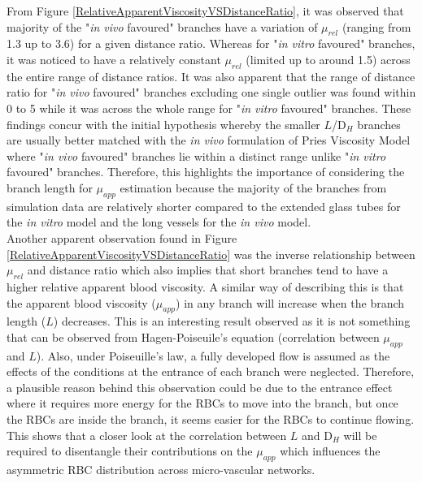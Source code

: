 \noindent From Figure \ref{RelativeApparentViscosityVSDistanceRatio}, it was observed that majority of the "\textit{in vivo} favoured" branches have a variation of $\mu_{rel}$ (ranging from 1.3 up to 3.6) for a given distance ratio. Whereas for "\textit{in vitro} favoured" branches, it was noticed to have a relatively constant $\mu_{rel}$ (limited up to around 1.5) across the entire range of distance ratios. It was also apparent that the range of distance ratio for "\textit{in vivo} favoured" branches excluding one single outlier was found within 0 to 5 while it was across the whole range for "\textit{in vitro} favoured" branches. These findings concur with the initial hypothesis whereby the smaller $L$/D$_{H}$ branches are usually better matched with the \textit{in vivo} formulation of Pries Viscosity Model where "\textit{in vivo} favoured" branches lie within a distinct range unlike "\textit{in vitro} favoured" branches. Therefore, this highlights the importance of considering the branch length for $\mu_{app}$ estimation because the majority of the branches from simulation data are relatively shorter compared to the extended glass tubes for the \textit{in vitro} model and the long vessels for the \textit{in vivo} model. \\


\noindent Another apparent observation found in Figure \ref{RelativeApparentViscosityVSDistanceRatio} was the inverse relationship between $\mu_{rel}$ and distance ratio which also implies that short branches tend to have a higher relative apparent blood viscosity. A similar way of describing this is that the apparent blood viscosity ($\mu_{app}$) in any branch will increase when the branch length ($L$) decreases. This is an interesting result observed as it is not something that can be observed from Hagen-Poiseuile's equation (correlation between $\mu_{app}$ and $L$). Also, under Poiseuille's law, a fully developed flow is assumed as the effects of the conditions at the entrance of each branch were neglected. Therefore, a plausible reason behind this observation could be due to the entrance effect where it requires more energy for the RBCs to move into the branch, but once the RBCs are inside the branch, it seems easier for the RBCs to continue flowing. This shows that a closer look at the correlation between $L$ and D$_{H}$ will be required to disentangle their contributions on the $\mu_{app}$ which influences the asymmetric RBC distribution across micro-vascular networks. \\

